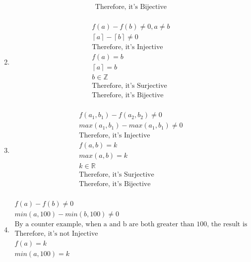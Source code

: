 \documentclass[12pt]{article}
\begin{document}
\begin{enumerate}
\begin{equation*}
\begin{split}
			\text{Therefore, it's Bijective}\\
	    	\end{split}
	    \end{equation*}
	\item 
	    \begin{equation*}
	    	\begin{split}
	    		f(a) - f(b) \ne 0, a\ne b\\
			\left\lceil a \right\rceil  - \left\lceil b \right\rceil  \ne 0\\
			\text{Therefore, it's Injective}\\
			f(a) = b\\
			\left\lceil a \right\rceil  = b\\
			b \in \mathbb{Z}\\
			\text{Therefore, it's Surjective}\\
			\text{Therefore, it's Bijective}\\
	    	\end{split}
	    \end{equation*}
	\item 
	    \begin{equation*}
	    	\begin{split}
	    		f(a_1, b_1) - f(a_2, b_2) \ne 0\\
			max(a_1, b_1) - max(a_1, b_1) \ne 0\\
			\text{Therefore, it's Injective}\\
			f(a,b) = k\\
			max(a,b) = k\\
			k \in \mathbb{R}\\
			\text{Therefore, it's Surjective}\\
			\text{Therefore, it's Bijective}\\
	    	\end{split}
	    \end{equation*}
	\item 
	    \begin{equation*}
	    	\begin{split}
	    		f(a) - f(b) \ne 0\\
			min(a, 100) - min(b, 100) \ne 0\\
			\text{By a counter example, when a and b are both greater than 100, the result is 0}\\
			\text{Therefore, it's not Injective}\\
			f(a) = k\\
			min(a,100) = k\\

\end{split}
\end{equation*}
\end{enumerate}
\end{document}
